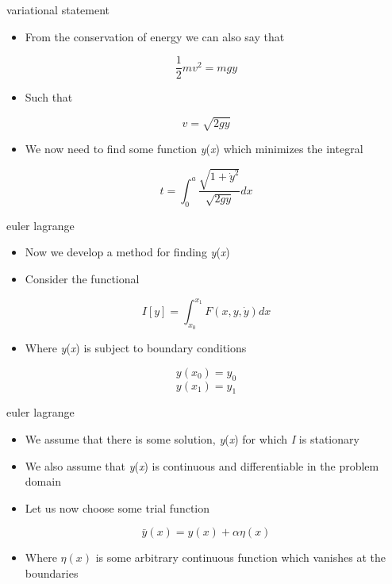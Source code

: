 \documentclass[12pt,handout]{beamer}
\providecommand{\tightlist}{%
  \setlength{\itemsep}{0pt}\setlength{\parskip}{0pt}}
\providecommand{\tightlist}{%
\setlength{\itemsep}{0pt}\setlength{\parskip}{0pt}}
\begin{document}
\begin{frame}{variational statement}
\protect\hypertarget{variational-statement-2}{}
\begin{itemize}
\tightlist
\item
  From the conservation of energy we can also say that
\end{itemize}

\[\frac{1}{2} m v^2 = m g y\]

\begin{itemize}
\tightlist
\item
  Such that
\end{itemize}

\[v = \sqrt{2 g y}\]

\begin{itemize}
\tightlist
\item
  We now need to find some function \emph{y}(\emph{x}) which minimizes
  the integral
\end{itemize}

\[t = \int_0^a \frac{\sqrt{1 + \dot{y}^2}}{\sqrt{2 g y}}dx\]
\end{frame}

\begin{frame}{euler lagrange}
\protect\hypertarget{euler-lagrange}{}
\begin{itemize}
\tightlist
\item
  Now we develop a method for finding \emph{y}(\emph{x})
\item
  Consider the functional
\end{itemize}

\[ I[y] = \int_{x_0}^{x_1} F(x,y,\dot{y})dx\]

\begin{itemize}
\tightlist
\item
  Where \emph{y}(\emph{x}) is subject to boundary conditions
\end{itemize}

\[ y(x_0) = y_0 \] \[ y(x_1) = y_1 \]
\end{frame}

\begin{frame}{euler lagrange}
\protect\hypertarget{euler-lagrange-1}{}
\begin{itemize}
\tightlist
\item
  We assume that there is some solution, \emph{y}(\emph{x}) for which
  \emph{I} is stationary
\item
  We also assume that \emph{y}(\emph{x}) is continuous and
  differentiable in the problem domain
\item
  Let us now choose some trial function
\end{itemize}

\[\bar{y}(x) = y(x) + \alpha \eta(x)\]

\begin{itemize}
\tightlist
\item
  Where \(\eta(x)\) is some arbitrary continuous function which vanishes
  at the boundaries
\end{itemize}
\end{frame}
\end{document}
